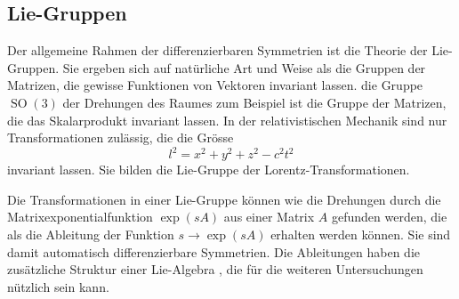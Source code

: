 %
%
\subsection{Lie-Gruppen}
Der allgemeine Rahmen der differenzierbaren Symmetrien ist die
Theorie der Lie-Gruppen.
%
Sie ergeben sich auf natürliche Art und Weise als die Gruppen der
Matrizen, die gewisse Funktionen von Vektoren invariant lassen.
die Gruppe $\operatorname{SO}(3)$ der Drehungen des Raumes
zum Beispiel ist die Gruppe der Matrizen, die das Skalarprodukt
invariant lassen.
In der relativistischen Mechanik
%
sind nur Transformationen zulässig, die die Grösse
\[
l^2
=
x^2+y^2+z^2-c^2t^2
\]
invariant lassen.
Sie bilden die Lie-Gruppe der Lorentz-Transformationen.

Die Transformationen in einer Lie-Gruppe können wie die Drehungen
durch die Matrixexponentialfunktion $\exp(sA)$ aus einer Matrix $A$
gefunden werden, die als die Ableitung der Funktion $s\to\exp(sA)$
erhalten werden können.
Sie sind damit automatisch differenzierbare Symmetrien.
Die Ableitungen haben die zusätzliche Struktur einer Lie-Algebra
\cite[p.~434]{buch:linalg}, die für die weiteren Untersuchungen
nützlich sein kann.

